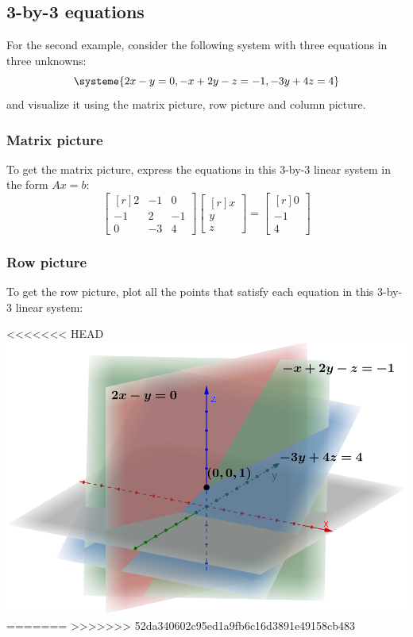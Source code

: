 \documentclass[../main.tex]{subfiles}
\begin{document}
\subsection{3-by-3 equations}
For the second example, consider the following system with three equations in three unknowns:
\[
    \systeme{2x - y = 0, -x + 2y - z = -1, -3y + 4z = 4}
\]
and visualize it using the matrix picture, row picture and column picture.

\subsubsection{Matrix picture}
To get the matrix picture, express the equations in this 3-by-3 linear system in the form \(Ax = b\):
\[
    \begin{bmatrix*}[r]
        2 & -1 & 0 \\
        -1 & 2 & -1 \\
        0 & -3 & 4
    \end{bmatrix*}
    \begin{bmatrix*}[r]
        x \\
        y \\
        z
    \end{bmatrix*}
    =
    \begin{bmatrix*}[r]
        0 \\
        -1 \\
        4
    \end{bmatrix*}
\]

\subsubsection{Row picture}
To get the row picture, plot all the points that satisfy each equation in this 3-by-3 linear system:

\begingroup
\centering
<<<<<<< HEAD
\includegraphics[width = 0.9\columnwidth]{../figures/fig03_3d-row-pic/geogebra-derived}
=======
>>>>>>> 52da340602c95ed1a9fb6c16d3891e49158cb483
\par
\endgroup
\end{document}
